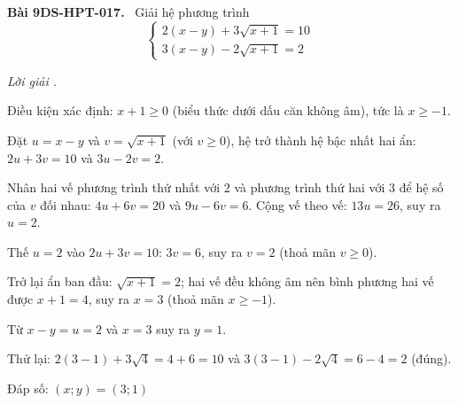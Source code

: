 \documentclass[12pt,a4paper]{article}
\newenvironment{problem}[1][]{\par\medskip\noindent\textbf{Bài #1.}\ }{\par}
\newenvironment{solution}[1][]{\par\noindent\textit{Lời giải #1.}\par}{\par}
\begin{document}
\begin{problem}[9DS-HPT-017]
Giải hệ phương trình
\[ \begin{cases} 2(x - y) + 3\sqrt{x + 1} = 10 \\ 3(x - y) - 2\sqrt{x + 1} = 2 \end{cases} \]

\begin{solution}
Điều kiện xác định: $x + 1 \geq 0$ (biểu thức dưới dấu căn không âm), tức là $x \geq -1$.

Đặt $u = x - y$ và $v = \sqrt{x + 1}$ (với $v \geq 0$), hệ trở thành hệ bậc nhất hai ẩn: $2u + 3v = 10$ và $3u - 2v = 2$.

Nhân hai vế phương trình thứ nhất với $2$ và phương trình thứ hai với $3$ để hệ số của $v$ đối nhau: $4u + 6v = 20$ và $9u - 6v = 6$. Cộng vế theo vế: $13u = 26$, suy ra $u = 2$.

Thế $u = 2$ vào $2u + 3v = 10$: $3v = 6$, suy ra $v = 2$ (thoả mãn $v \geq 0$).

Trở lại ẩn ban đầu: $\sqrt{x + 1} = 2$; hai vế đều không âm nên bình phương hai vế được $x + 1 = 4$, suy ra $x = 3$ (thoả mãn $x \geq -1$).

Từ $x - y = u = 2$ và $x = 3$ suy ra $y = 1$.

Thử lại: $2(3 - 1) + 3\sqrt{4} = 4 + 6 = 10$ và $3(3 - 1) - 2\sqrt{4} = 6 - 4 = 2$ (đúng).

Đáp số: $\boxed{(x; y) = (3; 1)}$
\end{solution}
\end{problem}
\end{document}
